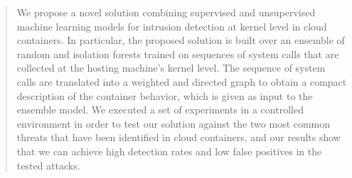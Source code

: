 \begin{abstract}
We propose a novel solution combining supervised and unsupervised machine learning models for intrusion detection at kernel level in cloud containers. In particular, the proposed solution is built over an ensemble of random and isolation forests trained on sequences of system calls that are collected at the hosting machine's kernel level. The sequence of system calls are translated into a weighted and directed graph to obtain a compact description of the container behavior, which is given as input to the ensemble model.
We executed a set of experiments in a controlled environment in order to test our solution against the two most common threats that have been identified in cloud containers, and our results show that we can achieve high detection rates and low false positives in the tested attacks.
\end{abstract}
